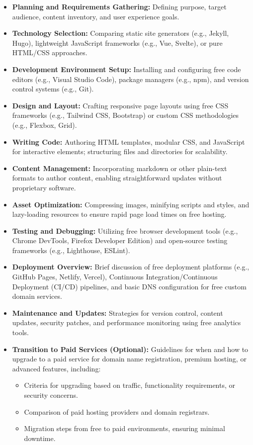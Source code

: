 \begin{itemize}
    \item \textbf{Planning and Requirements Gathering:} Defining purpose, target audience, content inventory, and user experience goals.
    \item \textbf{Technology Selection:} Comparing static site generators (e.g., Jekyll, Hugo), lightweight JavaScript frameworks (e.g., Vue, Svelte), or pure HTML/CSS approaches.
    \item \textbf{Development Environment Setup:} Installing and configuring free code editors (e.g., Visual Studio Code), package managers (e.g., npm), and version control systems (e.g., Git).
    \item \textbf{Design and Layout:} Crafting responsive page layouts using free CSS frameworks (e.g., Tailwind CSS, Bootstrap) or custom CSS methodologies (e.g., Flexbox, Grid).
    \item \textbf{Writing Code:} Authoring HTML templates, modular CSS, and JavaScript for interactive elements; structuring files and directories for scalability.
    \item \textbf{Content Management:} Incorporating markdown or other plain-text formats to author content, enabling straightforward updates without proprietary software.
    \item \textbf{Asset Optimization:} Compressing images, minifying scripts and styles, and lazy-loading resources to ensure rapid page load times on free hosting.
    \item \textbf{Testing and Debugging:} Utilizing free browser development tools (e.g., Chrome DevTools, Firefox Developer Edition) and open-source testing frameworks (e.g., Lighthouse, ESLint).
    \item \textbf{Deployment Overview:} Brief discussion of free deployment platforms (e.g., GitHub Pages, Netlify, Vercel), Continuous Integration/Continuous Deployment (CI/CD) pipelines, and basic DNS configuration for free custom domain services.
    \item \textbf{Maintenance and Updates:} Strategies for version control, content updates, security patches, and performance monitoring using free analytics tools.
    \item \textbf{Transition to Paid Services (Optional):} Guidelines for when and how to upgrade to a paid service for domain name registration, premium hosting, or advanced features, including:
    \begin{itemize}
        \item Criteria for upgrading based on traffic, functionality requirements, or security concerns.
        \item Comparison of paid hosting providers and domain registrars.
        \item Migration steps from free to paid environments, ensuring minimal downtime.
    \end{itemize}
\end{itemize}

